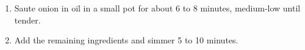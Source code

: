 \begin{enumerate}
  \item Saute onion in oil in a small pot for about 6 to 8 minutes, medium-low until tender.
  \item Add the remaining ingredients and simmer 5 to 10 minutes.
\end{enumerate}
